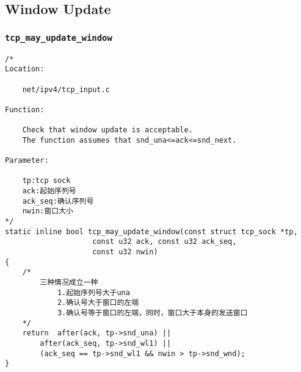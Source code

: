     \subsection{Window Update}
        \subsubsection{\texttt{tcp_may_update_window}}
            \label{WindowUpdate:tcp_may_update_window}
\begin{verbatim}
/* 
Location:

    net/ipv4/tcp_input.c

Function:

    Check that window update is acceptable.
    The function assumes that snd_una<=ack<=snd_next.

Parameter:

    tp:tcp sock
    ack:起始序列号
    ack_seq:确认序列号
    nwin:窗口大小
*/
static inline bool tcp_may_update_window(const struct tcp_sock *tp,
                    const u32 ack, const u32 ack_seq,
                    const u32 nwin)
{
    /*
        三种情况成立一种
            1.起始序列号大于una
            2.确认号大于窗口的左端
            3.确认号等于窗口的左端，同时，窗口大于本身的发送窗口
    */
    return  after(ack, tp->snd_una) ||
        after(ack_seq, tp->snd_wl1) ||
        (ack_seq == tp->snd_wl1 && nwin > tp->snd_wnd);
}
\end{verbatim}
